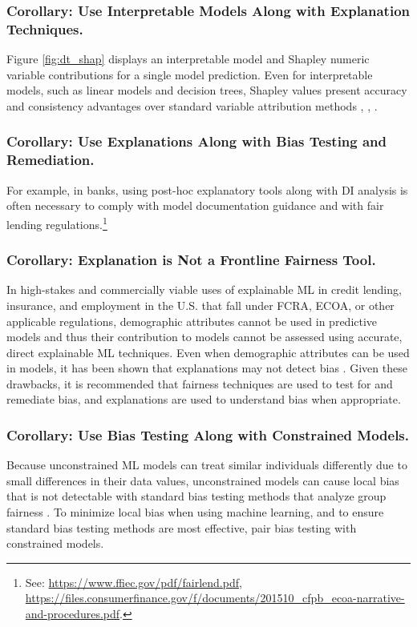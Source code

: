 \documentclass[sigconf]{acmart}
\begin{document}
\subsubsection{Corollary: Use Interpretable Models Along with Explanation Techniques.} Figure \ref{fig:dt_shap} displays an interpretable model and Shapley numeric variable contributions for a single model prediction. Even for interpretable models, such as linear models and decision trees, Shapley values present accuracy and consistency advantages over standard variable attribution methods \cite{lipovetsky2001analysis}, \cite{tree_shap}, \cite{shapley}. 

\subsubsection{Corollary: Use Explanations Along with Bias Testing and Remediation.} \label{cor:ex_bias} For example, in banks, using post-hoc explanatory tools along with DI analysis is often necessary to comply with model documentation guidance and with fair lending regulations.\footnote{\scriptsize{See: \url{https://www.ffiec.gov/pdf/fairlend.pdf}, \url{https://files.consumerfinance.gov/f/documents/201510_cfpb_ecoa-narrative-and-procedures.pdf}.}} 

\subsubsection{Corollary: Explanation is Not a Frontline Fairness Tool.} \label{cor:ex_not} In high-stakes and commercially viable uses of explainable ML in credit lending, insurance, and employment in the U.S. that fall under FCRA, ECOA, or other applicable regulations, demographic attributes cannot be used in predictive models and thus their contribution to models cannot be assessed using accurate, direct explainable ML techniques. Even when demographic attributes can be used in models, it has been shown that explanations may not detect bias \cite{fair_washing}. Given these drawbacks, it is recommended that fairness techniques are used to test for and remediate  bias, and explanations are used to understand bias when appropriate.  

\subsubsection{Corollary: Use Bias Testing Along with Constrained Models.} \label{cor:bias_con} Because unconstrained ML models can treat similar individuals differently due to small differences in their data values, unconstrained models can cause local bias that is not detectable with standard bias testing methods that analyze group fairness \cite{dwork2012fairness}. To minimize local bias when using machine learning, and to ensure standard bias testing methods are most effective, pair bias testing with constrained models.\\
\end{document}
